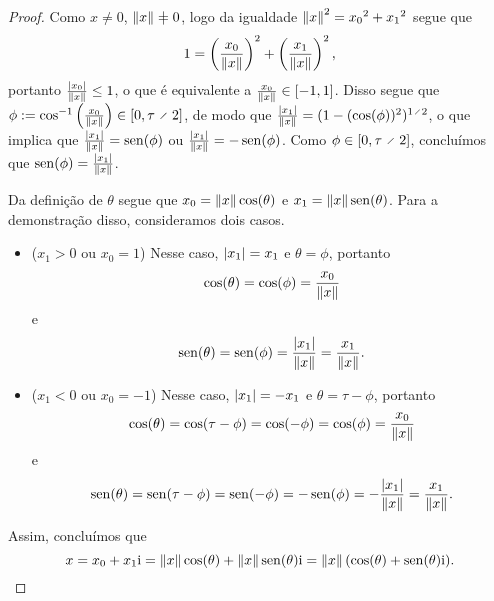 \begin{proof}
Como $x \neq 0$, $\nor{x} \neq 0$, logo da igualdade $\left\Vert{x}\right\Vert^2 = {x_0}^2 + {x_1}^2$ segue que
	\begin{equation*}
	1 = \left(\frac{x_0}{\left\Vert{x}\right\Vert}\right)^2 + \left(\frac{x_1}{\left\Vert{x}\right\Vert}\right)^2,
	\end{equation*}
portanto $\frac{\left\vert{x_0}\right\vert}{\left\Vert{x}\right\Vert} \leq 1$, o que é equivalente a $\frac{x_0}{\left\Vert{x}\right\Vert} \in \left[{-1},{1}\right]$. Disso segue que $\phi := \cos\inv\left(\frac{x_0}{\nor{x}}\right) \in \intff{0}{\tau \div 2}$, de modo que $\frac{\abs{x_1}}{\nor{x}} = (1-(\cos(\phi))^2)^{1 \div 2}$, o que implica que $\frac{\left\vert{x_1}\right\vert}{\left\Vert{x}\right\Vert} = \operatorname{sen}(\phi)$ ou $\frac{\left\vert{x_1}\right\vert}{\left\Vert{x}\right\Vert} = -\operatorname{sen}(\phi)$. Como $\phi \in \intff{0}{\tau \div 2}$, concluímos que $\operatorname{sen}(\phi) = \frac{\left\vert{x_1}\right\vert}{\left\Vert{x}\right\Vert}$.

Da definição de $\theta$ segue que $x_0 = \left\Vert{x}\right\Vert\cos(\theta)$ e $x_1 = \left\Vert{x}\right\Vert\operatorname{sen}(\theta)$. Para a demonstração disso, consideramos dois casos.
	\begin{itemize}
	\item ($x_1 > 0$ ou $x_0 = 1$) Nesse caso, $\left\vert{x_1}\right\vert=x_1$ e $\theta = \phi$, portanto
		\begin{equation*}
		\cos(\theta) = \cos(\phi) = \frac{x_0}{\left\Vert{x}\right\Vert}
		\end{equation*}
	e
		\begin{equation*}
		\operatorname{sen}(\theta) = \operatorname{sen}(\phi) = \frac{\left\vert{x_1}\right\vert}{\left\Vert{x}\right\Vert} = \frac{x_1}{\left\Vert{x}\right\Vert}.
		\end{equation*}
	
	\item ($x_1 < 0$ ou $x_0 = -1$) Nesse caso, $\left\vert{x_1}\right\vert=-x_1$ e $\theta = \tau - \phi$, portanto
		\begin{equation*}
		\cos(\theta) = \cos(\tau - \phi) = \cos(-\phi) = \cos (\phi)= \frac{x_0}{\left\Vert{x}\right\Vert}
		\end{equation*}
	e
		\begin{equation*}
		\operatorname{sen}(\theta) = \operatorname{sen}(\tau - \phi) = \operatorname{sen}(-\phi) = -\operatorname{sen}(\phi) = -\frac{\left\vert{x_1}\right\vert}{\left\Vert{x}\right\Vert} = \frac{x_1}{\left\Vert{x}\right\Vert}.
		\end{equation*}
	\end{itemize}

Assim, concluímos que
	\begin{equation*}
	x = x_0 + x_1 \mathrm{i} = \left\Vert{x}\right\Vert\cos(\theta) + \left\Vert{x}\right\Vert\operatorname{sen}(\theta) \mathrm{i} = \left\Vert{x}\right\Vert(\cos(\theta) + \operatorname{sen}(\theta) \mathrm{i}).
	\qedhere
	\end{equation*}
\end{proof}

